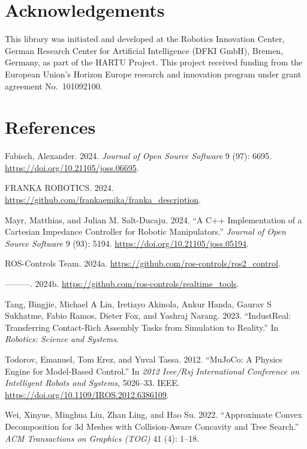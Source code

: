 \documentclass[10pt,a4paper,onecolumn]{article}
\let\textttOrig=\texttt
\def\texttt#1{\expandafter\textttOrig{\seqsplit{#1}}}
\let\addcontentslineOrig=\addcontentsline
\def\addcontentsline#1#2#3{\bgroup
  \let\texttt=\textttOrig\addcontentslineOrig{#1}{#2}{#3}\egroup}
\begin{document}
\hypertarget{acknowledgements}{%
\section{Acknowledgements}\label{acknowledgements}}

This library was initiated and developed at the Robotics Innovation
Center, German Research Center for Artificial Intelligence (DFKI GmbH),
Bremen, Germany, as part of the HARTU Project. This project received
funding from the European Union's Horizon Europe research and innovation
program under grant agreement No.~101092100.

\hypertarget{references}{%
\section*{References}\label{references}}

\hypertarget{refs}{}
\begin{cslreferences}
\leavevmode\hypertarget{ref-Fabisch2024}{}%
Fabisch, Alexander. 2024. \emph{Journal of Open Source Software} 9 (97):
6695. \url{https://doi.org/10.21105/joss.06695}.

\leavevmode\hypertarget{ref-franka_description}{}%
FRANKA ROBOTICS. 2024.
\url{https://github.com/frankaemika/franka_description}.

\leavevmode\hypertarget{ref-mayr2024cartesian}{}%
Mayr, Matthias, and Julian M. Salt-Ducaju. 2024. ``A C++ Implementation
of a Cartesian Impedance Controller for Robotic Manipulators.''
\emph{Journal of Open Source Software} 9 (93): 5194.
\url{https://doi.org/10.21105/joss.05194}.

\leavevmode\hypertarget{ref-ros2_control}{}%
ROS-Controls Team. 2024a.
\url{https://github.com/ros-controls/ros2_control}.

\leavevmode\hypertarget{ref-realtime_tools}{}%
---------. 2024b. \url{https://github.com/ros-controls/realtime_tools}.

\leavevmode\hypertarget{ref-tang2023industreal}{}%
Tang, Bingjie, Michael A Lin, Iretiayo Akinola, Ankur Handa, Gaurav S
Sukhatme, Fabio Ramos, Dieter Fox, and Yashraj Narang. 2023.
``IndustReal: Transferring Contact-Rich Assembly Tasks from Simulation
to Reality.'' In \emph{Robotics: Science and Systems}.

\leavevmode\hypertarget{ref-todorov2012mujoco}{}%
Todorov, Emanuel, Tom Erez, and Yuval Tassa. 2012. ``MuJoCo: A Physics
Engine for Model-Based Control.'' In \emph{2012 Ieee/Rsj International
Conference on Intelligent Robots and Systems}, 5026--33. IEEE.
\url{https://doi.org/10.1109/IROS.2012.6386109}.

\leavevmode\hypertarget{ref-wei2022coacd}{}%
Wei, Xinyue, Minghua Liu, Zhan Ling, and Hao Su. 2022. ``Approximate
Convex Decomposition for 3d Meshes with Collision-Aware Concavity and
Tree Search.'' \emph{ACM Transactions on Graphics (TOG)} 41 (4): 1--18.
\end{cslreferences}
\end{document}
